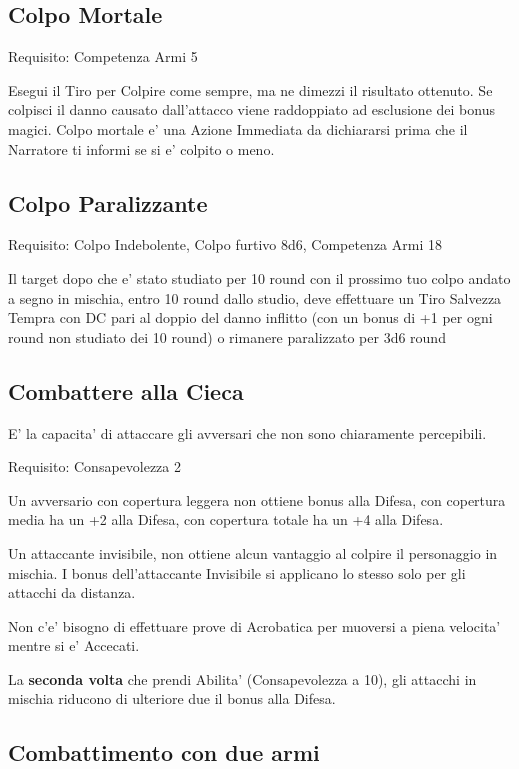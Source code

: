 \documentclass[a4paper,11pt,twoside,openany]{dndbook}
\begin{document}
\subsection{Colpo Mortale}

Requisito: Competenza Armi 5

Esegui il Tiro per Colpire come sempre, ma ne dimezzi il risultato ottenuto. Se colpisci il danno causato dall'attacco viene raddoppiato ad esclusione dei bonus magici. Colpo mortale e' una Azione Immediata da dichiararsi prima che il Narratore ti informi se si e' colpito o meno.

\subsection{Colpo Paralizzante}

Requisito: Colpo Indebolente, Colpo furtivo 8d6, Competenza Armi 18

Il target dopo che e' stato studiato per 10 round con il prossimo tuo colpo andato a segno in mischia, entro 10 round dallo studio, deve effettuare un Tiro Salvezza Tempra con DC pari al doppio del danno inflitto (con un bonus di +1 per ogni round non studiato dei 10 round) o rimanere paralizzato per 3d6 round

\subsection{Combattere alla Cieca}

E' la capacita' di attaccare gli avversari che non sono chiaramente percepibili.

Requisito: Consapevolezza 2

Un avversario con copertura leggera non ottiene bonus alla Difesa, con copertura media ha un +2 alla Difesa, con copertura totale ha un +4 alla Difesa.

Un attaccante invisibile, non ottiene alcun vantaggio al colpire il personaggio in mischia. I bonus dell'attaccante Invisibile si applicano lo stesso solo per gli attacchi da distanza.

Non c'e' bisogno di effettuare prove di Acrobatica per muoversi a piena velocita' mentre si e' Accecati.

La \textbf{seconda volta} che prendi Abilita' (Consapevolezza a 10), gli attacchi in mischia riducono di ulteriore due il bonus alla Difesa.

\subsection{Combattimento con due armi}
\end{document}
